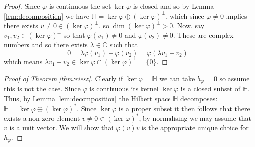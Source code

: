 \documentclass[12pt]{article}
\theoremstyle{plain}
\theoremstyle{definition}
\newcommand{\bb}[1]{\mathbb{#1}}
\begin{document}
\begin{proof}
Since $\varphi$ is continuous the set $\operatorname{ker}\varphi$ is closed and so by Lemma \ref{lem:decomposition} we have $\bb{H} = \operatorname{ker}\varphi \oplus (\operatorname{ker}\varphi)^\perp$, which since $\varphi\neq 0$ implies there exists $v\neq 0 \in (\operatorname{ker}\varphi)^\perp$, so $\operatorname{dim}(\operatorname{ker}\varphi)^\perp > 0$. Now, say $v_1,v_2 \in (\operatorname{ker}\varphi)^\perp$ so that $\varphi(v_1) \neq 0$ and $\varphi(v_2) \neq 0$. These are complex numbers and so there exists $\lambda \in \bb{C}$ such that
\[0 = \lambda \varphi(v_1) - \varphi(v_2) = \varphi(\lambda v_1 - v_2)\]
which means $\lambda v_1 - v_2 \in \operatorname{ker}\varphi \cap (\operatorname{ker}\varphi)^\perp = \lbrace 0 \rbrace$.
\end{proof}
\begin{proof}[Proof of Theorem \ref{thm:riesz}]
Clearly if $\operatorname{ker}\varphi = \bb{H}$ we can take $h_\varphi = 0$ so assume this is not the case. Since $\varphi$ is continuous its kernel $\operatorname{ker}\varphi$ is a closed subset of $\bb{H}$. Thus, by Lemma \ref{lem:decomposition} the Hilbert space $\bb{H}$ decomposes: $\bb{H} = \operatorname{ker}\varphi \oplus (\operatorname{ker}\varphi)^\ast$. Since $\operatorname{ker}\varphi$ is a proper subset it then follows that there exists a non-zero element $v\neq0 \in (\operatorname{ker}\varphi)^\ast$, by normalising we may assume that $v$ is a unit vector. We will show that $\overline{\varphi(v)}v$ is the appropriate unique choice for $h_\varphi$.


\end{proof}
\end{document}
